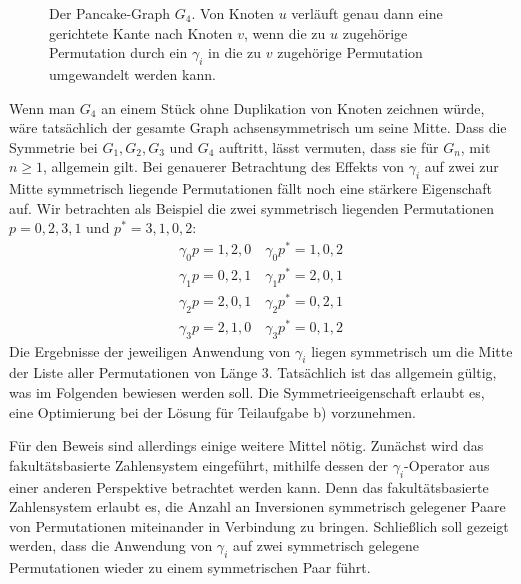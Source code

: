 \documentclass[a4paper, 10pt, ngerman]{article}
\begin{document}
\begin{figure}
    \caption{Der Pancake-Graph $G_4$. Von Knoten $u$ verläuft genau dann eine gerichtete Kante nach Knoten $v$, wenn die zu $u$ zugehörige Permutation durch ein $\gamma_i$ in die zu $v$ zugehörige Permutation umgewandelt werden kann.}
\end{figure}
\newpage

Wenn man $G_4$ an einem Stück ohne Duplikation von Knoten zeichnen würde, wäre tatsächlich der gesamte Graph achsensymmetrisch um seine Mitte. Dass die Symmetrie bei $G_1, G_2, G_3$ und $G_4$ auftritt, lässt vermuten, dass sie für $G_n$, mit $n \ge 1$, allgemein gilt. Bei genauerer Betrachtung des Effekts von $\gamma_i$ auf zwei zur Mitte symmetrisch liegende Permutationen fällt noch eine stärkere Eigenschaft auf. Wir betrachten als Beispiel die zwei symmetrisch liegenden Permutationen $p = 0,2,3,1$ und $p^* = 3, 1, 0, 2$:
\begin{align*}
    \gamma_0 p = 1, 2, 0 \quad \gamma_0 p^* = 1, 0, 2 \\
    \gamma_1 p = 0, 2, 1 \quad \gamma_1 p^* = 2, 0, 1 \\
    \gamma_2 p = 2, 0, 1 \quad \gamma_2 p^* = 0, 2, 1 \\
    \gamma_3 p = 2, 1, 0 \quad \gamma_3 p^* = 0, 1, 2
\end{align*}
Die Ergebnisse der jeweiligen Anwendung von $\gamma_i$ liegen symmetrisch um die Mitte der Liste aller Permutationen von Länge 3. Tatsächlich ist das allgemein gültig, was im Folgenden bewiesen werden soll. Die Symmetrieeigenschaft erlaubt es, eine Optimierung bei der Lösung für Teilaufgabe b) vorzunehmen.

Für den Beweis sind allerdings einige weitere Mittel nötig. Zunächst wird das fakultätsbasierte Zahlensystem eingeführt, mithilfe dessen der $\gamma_i$-Operator aus einer anderen Perspektive betrachtet werden kann. Denn das fakultätsbasierte Zahlensystem erlaubt es, die Anzahl an Inversionen symmetrisch gelegener Paare von Permutationen miteinander in Verbindung zu bringen. Schließlich soll gezeigt werden, dass die Anwendung von $\gamma_i$ auf zwei symmetrisch gelegene Permutationen wieder zu einem symmetrischen Paar führt.
\medskip
\end{document}
